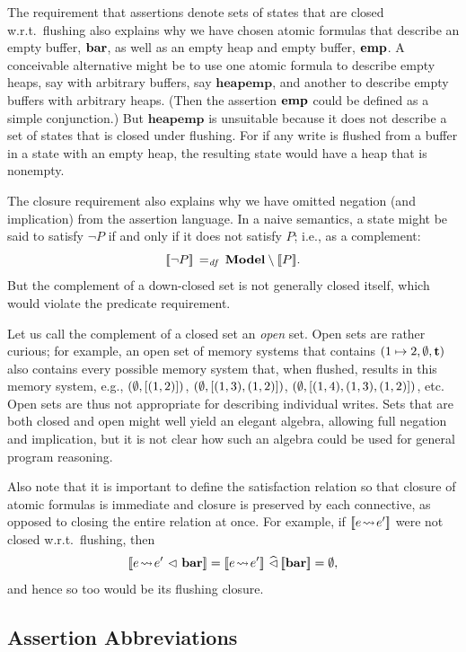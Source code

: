 \documentclass[11pt]{report}
\begin{document}
The requirement that assertions denote sets of states that are closed w.r.t.~flushing also explains why we have chosen atomic formulas that describe an empty buffer, $\mathbf{bar}$, as well as an empty heap and empty buffer, $\mathbf{emp}$. A conceivable alternative might be to use one atomic formula to describe empty heaps, say with arbitrary buffers, say $\mathbf{heapemp}$, and another to describe empty buffers with arbitrary heaps. (Then the assertion $\mathbf{emp}$ could be defined as a simple conjunction.) But $\mathbf{heapemp}$ is unsuitable because it does not describe a set of states that is closed under flushing. For if any write is flushed from a buffer in a state with an empty heap, the resulting state would have a heap that is nonempty. 

The closure requirement also explains why we have omitted negation (and implication) from the assertion language. In a naive semantics, a state might be said to satisfy $\neg P$ if and only if it does not satisfy $P$; i.e., as a complement: \[ [\![\neg P]\!] \operatorname{\;=_{\mathit{df}}\;} \mathbf{Model} \setminus [\![P]\!]. \] But the complement of a down-closed set is not generally closed itself, which would violate the predicate requirement. 

Let us call the complement of a closed set an \emph{open} set. Open sets are rather curious; for example, an open set of memory systems that contains $(1 \mapsto 2,\operatorname{\emptyset},\mathbf{t})$ also contains every possible memory system that, when flushed, results in this memory system, e.g., $(\operatorname{\emptyset}, \left[(1,2)\right])$, $(\operatorname{\emptyset}, \left[(1,3),(1,2)\right])$, $(\operatorname{\emptyset}, \left[(1,4),(1,3),(1,2)\right])$, etc. Open sets are thus not appropriate for describing individual writes. Sets that are both closed and open might well yield an elegant algebra, allowing full negation and implication, but it is not clear how such an algebra could be used for general program reasoning. 

Also note that it is important to define the satisfaction relation so that closure of atomic formulas is immediate and closure is preserved by each connective, as opposed to closing the entire relation at once. For example, if $[\![e \!\leadsto\! e']\!]$ were not closed w.r.t.~flushing, then \[\pred{e \fwriteu e' \fseq \fbaru} = \pred{e \fwriteu e'} \mseq \pred{\fbaru} = \nil,\] and hence so too would be its flushing closure.  

\subsection{Assertion Abbreviations}
\label{sec:uniprocessor-abbreviations} 
\end{document}
